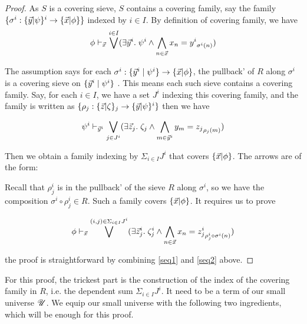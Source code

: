 \begin{proof}
  As $S$ is a covering sieve, $S$ contains a covering family, say the family $\{\sigma^i: \{ \vec{y} | \psi \}^i\to \{ \vec{x} | \phi \}\}$ indexed by $i\in I$. 
  By definition of covering family, we have 
  \begin{equation}\label{seq1}
    \phi \vdash_{\vec{x}} \bigvee^{i\in I} (\exists \vec{y}^i. \;\psi^i \wedge \bigwedge_{n \in \vec{x}} x_n = {y^i}_{\sigma^i(n)})
  \end{equation}

  The assumption says for each $\sigma^i: \{\vec{y}^i\mid \psi^i\} \to \{ \vec{x} | \phi \}$, the pullback' of $R$ along $\sigma^i$ is a covering sieve
  on  $\{\vec{y}^i\mid \psi^i\}$ .
  This means each such sieve contains a covering family. Say, for each $i\in I$, we have a set $J^i$ indexing this covering family, and 
  the family is written as $\{\rho_j: \{ \vec{z} | \zeta \}_j\to \{ \vec{y} | \psi \}^i\}$ then we have

  \begin{equation}\label{seq2}
    \psi^i \vdash_{\vec{y}^i} \bigvee_{j\in J^i}
     (\exists \vec{z}_j.\; \zeta_j \wedge \bigwedge_{m \in \vec{y}^i} y_m = {z_j}_{\rho_j(m)})
  \end{equation}

  Then we obtain a family indexing by $\Sigma_{i\in I}J^i$ that covers $\{ \vec{x} | \phi \}$. The arrows are of the form:
  \begin{center}
  \end{center}
  Recall that $\rho^i_j$ is in the pullback' of the sieve $R$ along $\sigma^i$, so we have the composition $\sigma^i\circ \rho^i_j\in R$. 
  Such a family covers $\{ \vec{x} | \phi \}$. It requires us to prove 

  \begin{equation*}
    \phi \vdash_{\vec{x}} \bigvee^{(i,j)\in \Sigma_{i\in I}J^i} 
    (\exists \vec{z}^i_j.\; \zeta^i_j \wedge \bigwedge_{n\in \vec{x}} x_n = {z^i_j}_{\rho^i_j\circ \sigma^i(n)})
  \end{equation*}
  
  the proof is straightforward by combining \ref{seq1} and \ref{seq2} above. 

  
 
\end{proof}

For this proof, the trickest part is the construction of the index of the covering family in $R$, i.e. the dependent sum $\Sigma_{i\in I}J^i$. 
It need to be a term of our small universe $\mathscr{U}$. We equip our small universe with the following two ingredients, which will be enough for this proof.


